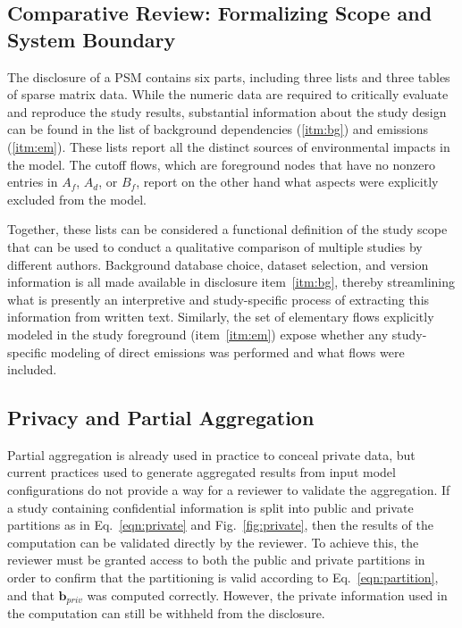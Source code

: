 

\subsection{Comparative Review: Formalizing Scope and System Boundary}

The disclosure of a PSM contains six parts, including three lists and three tables of sparse matrix data.  While the numeric data are required to critically evaluate and reproduce the study results, substantial information about the study design can be found in the list of background dependencies (\ref{itm:bg}) and emissions (\ref{itm:em}).  These lists report all the distinct sources of environmental impacts in the model.  The cutoff flows, which are foreground nodes that have no nonzero entries in $A_f$, $A_d$, or $B_f$, report on the other hand what aspects were explicitly excluded from the model.

Together, these lists can be considered a functional definition of the study scope that can be used to conduct a qualitative comparison of multiple studies by different authors.  Background database choice, dataset selection, and version information is all made available in disclosure item~\ref{itm:bg}, thereby streamlining what is presently an interpretive and study-specific process of extracting this information from written text.  Similarly, the set of elementary flows explicitly modeled in the study foreground (item~\ref{itm:em}) expose whether any study-specific modeling of direct emissions was performed and what flows were included.


\subsection{Privacy and Partial Aggregation} 

Partial aggregation is already used in practice to conceal private data, but current practices used to generate aggregated results from input model configurations do not provide a way for a reviewer to validate the aggregation.  If a study containing confidential information is split into public and private partitions as in Eq.~\ref{eqn:private} and Fig.~\ref{fig:private}, then the results of the computation can be validated directly by the reviewer.  To achieve this, the reviewer must be granted access to both the public and private partitions in order to confirm that the partitioning is valid according to Eq.~\ref{eqn:partition}, and that $\mathbf{b}_{priv}$ was computed correctly.  However, the private information used in the computation can still be withheld from the disclosure.

